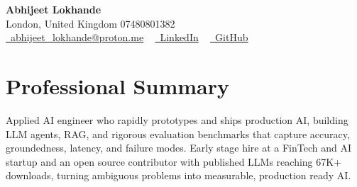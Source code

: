 \documentclass[a4paper,10pt]{article}
\begin{document}
    \begin{center}
        {\Huge\bfseries Abhijeet Lokhande}
        \\[2pt] {\color{muted}London, United Kingdom \textbar{} 07480801382}\\
        \small
        \href{mailto:abhijeet_lokhande@proton.me}{\raisebox{-0.2\height}{\color{primary}\faEnvelope}\  \underline{abhijeet\_lokhande@proton.me}} ~
        \href{https://www.linkedin.com/in/ablds/}{\raisebox{-0.2\height}{\color{primary}\faLinkedin}\ \underline{LinkedIn}}  ~
        \href{https://github.com/abhijeetscode}{\raisebox{-0.2\height}{\color{primary}\faGithub}\ \underline{GitHub}}
    \end{center}

\section{Professional Summary}
\vspace{-5pt}
{\color{muted}Applied AI engineer who rapidly prototypes and ships production AI, building LLM agents, RAG, and rigorous evaluation benchmarks that capture accuracy, groundedness, latency, and failure modes. Early stage hire at a FinTech and AI startup and an open source contributor with published LLMs reaching 67K+ downloads, turning ambiguous problems into measurable, production ready AI.}
\vspace{2pt}

\end{document}

